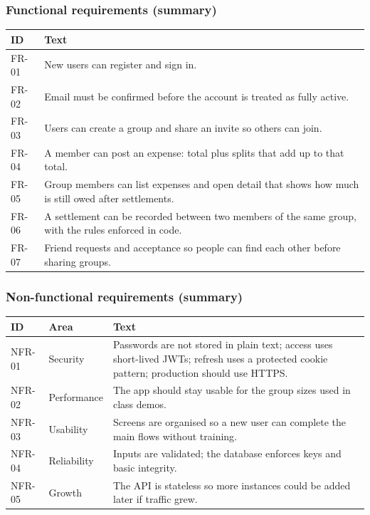 \documentclass[11pt,a4paper]{article}
\begin{document}
\subsubsection{Functional requirements (summary)}

\begin{center}
\begin{tabular}{@{}p{}p{}@{}}
\toprule
\textbf{ID} & \textbf{Text} \\
\midrule
FR-01 & New users can register and sign in. \\
FR-02 & Email must be confirmed before the account is treated as fully active. \\
FR-03 & Users can create a group and share an invite so others can join. \\
FR-04 & A member can post an expense: total plus splits that add up to that total. \\
FR-05 & Group members can list expenses and open detail that shows how much is still owed after settlements. \\
FR-06 & A settlement can be recorded between two members of the same group, with the rules enforced in code. \\
FR-07 & Friend requests and acceptance so people can find each other before sharing groups. \\
\bottomrule
\end{tabular}
\end{center}

\subsubsection{Non-functional requirements (summary)}

\begin{center}
\small
\begin{tabular}{@{}p{}p{}p{}@{}}
\toprule
\textbf{ID} & \textbf{Area} & \textbf{Text} \\
\midrule
NFR-01 & Security & Passwords are not stored in plain text; access uses short-lived JWTs; refresh uses a protected cookie pattern; production should use HTTPS. \\
NFR-02 & Performance & The app should stay usable for the group sizes used in class demos. \\
NFR-03 & Usability & Screens are organised so a new user can complete the main flows without training. \\
NFR-04 & Reliability & Inputs are validated; the database enforces keys and basic integrity. \\
NFR-05 & Growth & The API is stateless so more instances could be added later if traffic grew. \\
\bottomrule
\end{tabular}
\end{center}
\end{document}
